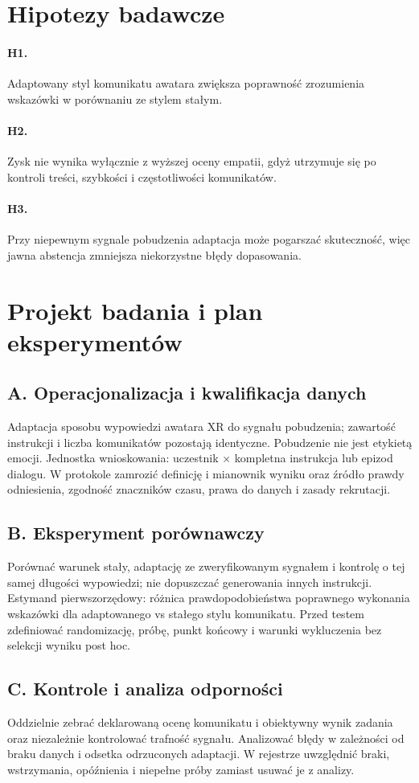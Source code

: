 \documentclass[11pt,a4paper]{article}
\begin{document}
\section{Hipotezy badawcze}
\paragraph{H1.} Adaptowany styl komunikatu awatara zwiększa poprawność zrozumienia wskazówki w porównaniu ze stylem stałym.
\paragraph{H2.} Zysk nie wynika wyłącznie z wyższej oceny empatii, gdyż utrzymuje się po kontroli treści, szybkości i częstotliwości komunikatów.
\paragraph{H3.} Przy niepewnym sygnale pobudzenia adaptacja może pogarszać skuteczność, więc jawna abstencja zmniejsza niekorzystne błędy dopasowania.
\section{Projekt badania i plan eksperymentów}
\subsection{A. Operacjonalizacja i kwalifikacja danych}
Adaptacja sposobu wypowiedzi awatara XR do sygnału pobudzenia; zawartość instrukcji i liczba komunikatów pozostają identyczne. Pobudzenie nie jest etykietą emocji. Jednostka wnioskowania: uczestnik × kompletna instrukcja lub epizod dialogu. W protokole zamrozić definicję i mianownik wyniku oraz źródło prawdy odniesienia, zgodność znaczników czasu, prawa do danych i zasady rekrutacji.
\subsection{B. Eksperyment porównawczy}
Porównać warunek stały, adaptację ze zweryfikowanym sygnałem i kontrolę o tej samej długości wypowiedzi; nie dopuszczać generowania innych instrukcji. Estymand pierwszorzędowy: różnica prawdopodobieństwa poprawnego wykonania wskazówki dla adaptowanego vs stałego stylu komunikatu. Przed testem zdefiniować randomizację, próbę, punkt końcowy i warunki wykluczenia bez selekcji wyniku post hoc.
\subsection{C. Kontrole i analiza odporności}
Oddzielnie zebrać deklarowaną ocenę komunikatu i obiektywny wynik zadania oraz niezależnie kontrolować trafność sygnału. Analizować błędy w zależności od braku danych i odsetka odrzuconych adaptacji. W rejestrze uwzględnić braki, wstrzymania, opóźnienia i niepełne próby zamiast usuwać je z analizy.
\end{document}
